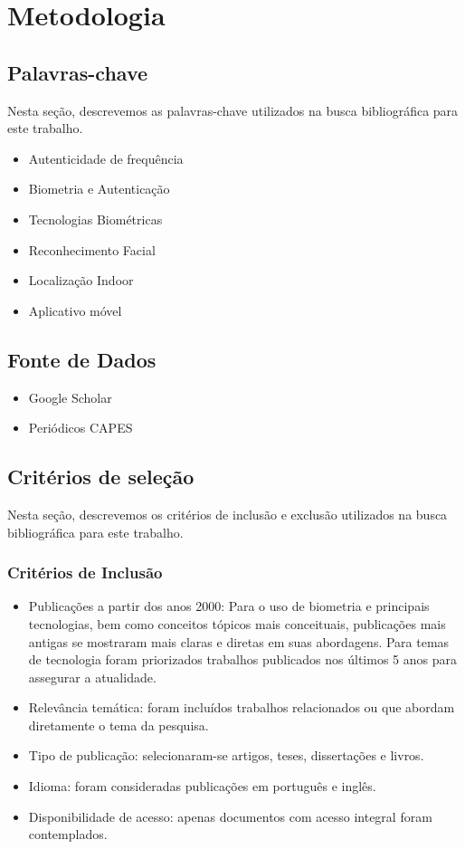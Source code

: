 \chapter{Metodologia}\label{ch:metodologia}


\section{Palavras-chave}\label{sec:palavras-chave}
Nesta seção, descrevemos as palavras-chave utilizados na busca bibliográfica para este trabalho.

\begin{itemize}
    \item Autenticidade de frequência
    \item Biometria e Autenticação
    \item Tecnologias Biométricas
    \item Reconhecimento Facial
    \item Localização Indoor
    \item Aplicativo móvel
\end{itemize}


\section{Fonte de Dados}\label{sec:fonte-dados}
\begin{itemize}
    \item Google Scholar
    \item Periódicos CAPES
\end{itemize}


\section{Critérios de seleção}\label{sec:criterios-de-inclusao}
Nesta seção, descrevemos os critérios de inclusão e exclusão utilizados na busca bibliográfica para este trabalho.

\subsection{Critérios de Inclusão}\label{subsec:criterios-de-inclusao}

\begin{itemize}
    \item Publicações a partir dos anos 2000: Para o uso de biometria e principais tecnologias, bem como conceitos tópicos mais conceituais, publicações mais antigas se mostraram mais claras e diretas em suas abordagens.
    Para temas de tecnologia foram priorizados trabalhos publicados nos últimos 5 anos para assegurar a atualidade.
    \item Relevância temática: foram incluídos trabalhos relacionados ou que abordam diretamente o tema da pesquisa.
    \item Tipo de publicação: selecionaram-se artigos, teses, dissertações e livros.
    \item Idioma: foram consideradas publicações em português e inglês.
    \item Disponibilidade de acesso: apenas documentos com acesso integral foram contemplados.
\end{itemize}

